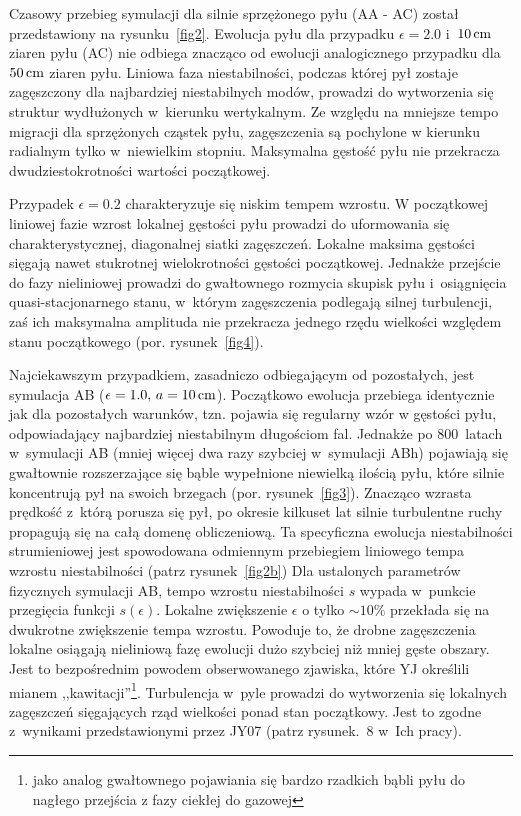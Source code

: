 Czasowy przebieg symulacji dla silnie sprzężonego pyłu (AA - AC) został
przedstawiony na rysunku~\ref{fig2}. Ewolucja pyłu dla przypadku $\epsilon =
2.0$ i~$10\hbox{$\thinspace\textrm{cm}$}$ ziaren pyłu (AC) nie odbiega znacząco od ewolucji analogicznego
przypadku dla $50\hbox{$\thinspace\textrm{cm}$}$ ziaren pyłu. Liniowa faza niestabilności, podczas której
pył zostaje zagęszczony dla najbardziej niestabilnych modów, prowadzi do
wytworzenia się struktur wydłużonych w~kierunku wertykalnym. Ze względu na
mniejsze tempo migracji dla sprzężonych cząstek pyłu, zagęszczenia są pochylone
w kierunku radialnym tylko w~niewielkim stopniu. Maksymalna gęstość pyłu nie
przekracza dwudziestokrotności wartości początkowej.
\par Przypadek $\epsilon = 0.2$ charakteryzuje się niskim tempem wzrostu. W
początkowej liniowej fazie wzrost lokalnej gęstości pyłu prowadzi do uformowania
się charakterystycznej, diagonalnej siatki zagęszczeń. Lokalne maksima gęstości
sięgają nawet stukrotnej wielokrotności gęstości początkowej. Jednakże przejście
do fazy nieliniowej prowadzi do gwałtownego rozmycia skupisk pyłu i~osiągnięcia
quasi-stacjonarnego stanu, w~którym zagęszczenia podlegają silnej turbulencji,
zaś ich maksymalna amplituda nie przekracza jednego rzędu wielkości względem
stanu początkowego (por. rysunek~\ref{fig4}).

\par Najciekawszym przypadkiem, zasadniczo odbiegającym od pozostałych, jest
symulacja AB ($\epsilon=1.0,\, a=10\hbox{$\thinspace\textrm{cm}$}$). Początkowo ewolucja przebiega
identycznie jak dla pozostałych warunków, tzn. pojawia się regularny wzór
w gęstości pyłu, odpowiadający najbardziej niestabilnym długościom fal. Jednakże 
po $800$~latach w~symulacji AB (mniej więcej dwa razy szybciej w~symulacji ABh)
pojawiają się gwałtownie rozszerzające się bąble wypełnione niewielką ilością
pyłu, które silnie koncentrują pył na swoich brzegach (por. rysunek~\ref{fig3}). 
Znacząco wzrasta prędkość z~którą porusza się pył, po okresie kilkuset lat
silnie turbulentne ruchy propagują się na całą domenę obliczeniową. Ta
specyficzna ewolucja niestabilności strumieniowej jest spowodowana odmiennym
przebiegiem liniowego tempa wzrostu niestabilności (patrz rysunek~\ref{fig2b})
Dla ustalonych parametrów fizycznych symulacji AB, tempo wzrostu niestabilności
$s$ wypada w~punkcie przegięcia funkcji $s(\epsilon)$. Lokalne zwiększenie
$\epsilon$ o tylko $\sim10\%$ przekłada się na dwukrotne zwiększenie tempa
wzrostu. Powoduje to, że drobne zagęszczenia lokalne osiągają nieliniową fazę
ewolucji dużo szybciej niż mniej gęste obszary.  Jest to bezpośrednim powodem
obserwowanego zjawiska, które YJ określili mianem ,,kawitacji''\footnote{jako
analog gwałtownego pojawiania się bardzo rzadkich bąbli pyłu do nagłego
przejścia z fazy ciekłej do gazowej}.  Turbulencja w~pyle prowadzi do
wytworzenia się lokalnych zagęszczeń sięgających rząd wielkości ponad stan
początkowy. Jest to zgodne z~wynikami przedstawionymi przez JY07 (patrz
rysunek.~8 w~Ich pracy).

